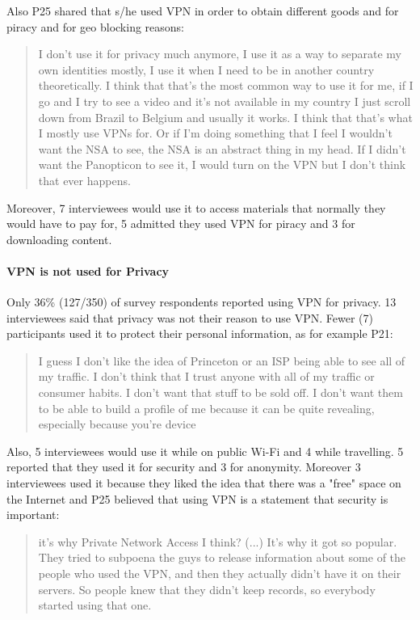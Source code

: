 Also P25 shared that s/he used VPN in order to obtain different goods and for
piracy and for geo blocking reasons: \begin{quote}I don't use it for privacy
much anymore, I use it as a way to separate my own identities mostly, I use it
when I need to be in another country theoretically. I think that that's the
most common way to use it for me, if I go and I try to see a video and it's
not available in my country I just scroll down from Brazil to Belgium and
usually it works. I think that that's what I mostly use VPNs for. Or if I'm
doing something that I feel I wouldn't want  the NSA to see,  the NSA  is an abstract
thing in my head. If I didn't want the Panopticon to see it, I would turn on
the VPN but I don't think that ever happens.\end{quote}

Moreover, 7 interviewees would use it to access materials that normally they
would have to pay for, 5 admitted they used VPN for piracy and 3 for
downloading content.



\paragraph{VPN is not used for Privacy} Only 36\% (127/350) of survey respondents reported using VPN for privacy. 13 interviewees said that privacy was not
their reason to use VPN. Fewer (7) participants used it to protect their
personal information, as for example P21: \begin{quote}I guess I don't like
the idea of Princeton or an ISP being able to see all of my traffic. I don't
think that I trust anyone with all of my traffic or consumer habits. I don't
want that stuff to be sold off. I don't want them to be able to build a
profile of me because it can be quite revealing, especially because you're
device\end{quote}


Also, 5 interviewees would use it while on public Wi-Fi and 4 while
travelling. 5 reported that they used it for security and 3 for anonymity.
Moreover 3 interviewees used it because they liked the idea that there was a
"free" space on the Internet and P25 believed that using VPN is a statement
that security is important:

\begin{quote}it's why Private Network Access I think? (...) It's why it got so
popular. They tried to subpoena the guys to release information about some of
the people who used the VPN, and then they actually didn't have it on their
servers. So people knew that they didn't keep records, so everybody started
using that one. \end{quote}


